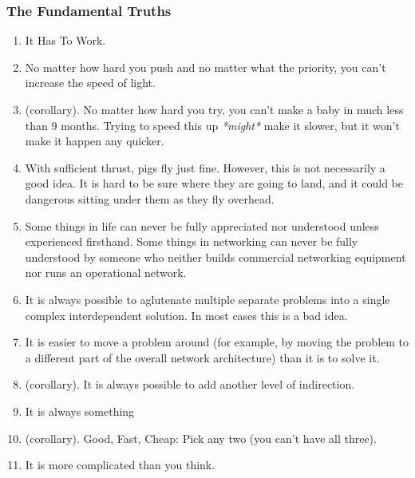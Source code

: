 \documentclass{article}
\begin{document}
\subsubsection{The Fundamental Truths} 
 \begin{enumerate}
    
    \item  It Has To Work.
    \item  No matter how hard you push and no matter what the priority,
    you can't increase the speed of light.
        
    \item (corollary). No matter how hard you try, you can't make a
             baby in much less than 9 months. Trying to speed this up
             \textit{*might*} make it slower, but it won't make it happen any
             quicker.
    
   \item With sufficient thrust, pigs fly just fine. However, this is
        not necessarily a good idea. It is hard to be sure where they
        are going to land, and it could be dangerous sitting under them
        as they fly overhead.

   \item  Some things in life can never be fully appreciated nor
        understood unless experienced firsthand. Some things in
        networking can never be fully understood by someone who neither
        builds commercial networking equipment nor runs an operational
        network.

    \item  It is always possible to aglutenate multiple separate problems
        into a single complex interdependent solution. In most cases
        this is a bad idea.

    \item  It is easier to move a problem around (for example, by moving
        the problem to a different part of the overall network
        architecture) than it is to solve it.
    \item(corollary). It is always possible to add another level of
             indirection.
    
    \item  It is always something
    \item (corollary). Good, Fast, Cheap: Pick any two (you can't  have all three).
    
    \item  It is more complicated than you think.


\end{enumerate}
\end{document}
